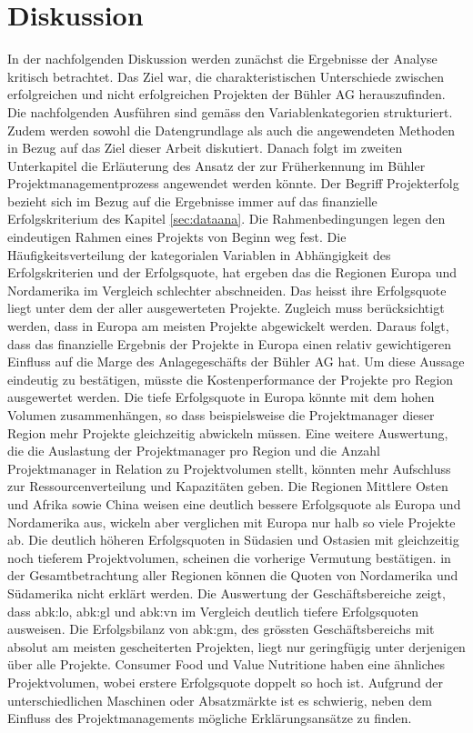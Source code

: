 \chapter{Diskussion}\label{sec:disk}
In der nachfolgenden Diskussion werden zunächst die Ergebnisse der Analyse kritisch betrachtet. Das Ziel war, die charakteristischen Unterschiede zwischen erfolgreichen und nicht erfolgreichen Projekten der Bühler AG herauszufinden. Die nachfolgenden Ausführen sind gemäss den Variablenkategorien strukturiert. Zudem werden sowohl die Datengrundlage als auch die angewendeten Methoden in Bezug auf das Ziel dieser Arbeit diskutiert. Danach folgt im zweiten Unterkapitel die Erläuterung des Ansatz der zur Früherkennung im Bühler Projektmanagementprozess angewendet werden könnte. Der Begriff Projekterfolg bezieht sich im Bezug auf die Ergebnisse immer auf das finanzielle Erfolgskriterium des Kapitel \ref{sec:dataana}.
\newline
Die Rahmenbedingungen legen den eindeutigen Rahmen eines Projekts von Beginn weg fest. Die Häufigkeitsverteilung der kategorialen Variablen in Abhängigkeit des Erfolgskriterien und der Erfolgsquote, hat ergeben das die Regionen Europa und Nordamerika im Vergleich schlechter abschneiden. Das heisst ihre Erfolgsquote liegt unter dem der aller ausgewerteten Projekte. Zugleich muss berücksichtigt werden, dass in Europa am meisten Projekte abgewickelt werden. Daraus folgt, dass das finanzielle Ergebnis der Projekte in Europa einen relativ gewichtigeren Einfluss auf die Marge des Anlagegeschäfts der Bühler AG hat. Um diese Aussage eindeutig zu bestätigen, müsste die Kostenperformance der Projekte pro Region ausgewertet werden. Die tiefe Erfolgsquote in Europa könnte mit dem hohen Volumen zusammenhängen, so dass beispielsweise die Projektmanager dieser Region mehr Projekte gleichzeitig abwickeln müssen. Eine weitere Auswertung, die die Auslastung der Projektmanager pro Region und die Anzahl Projektmanager in Relation zu Projektvolumen stellt, könnten mehr Aufschluss zur Ressourcenverteilung und Kapazitäten geben. Die Regionen Mittlere Osten und Afrika sowie China weisen eine deutlich bessere Erfolgsquote als Europa und Nordamerika aus, wickeln aber verglichen mit Europa nur halb so viele Projekte ab. Die deutlich höheren Erfolgsquoten in Südasien und Ostasien mit gleichzeitig noch tieferem Projektvolumen, scheinen die vorherige Vermutung bestätigen. in der Gesamtbetrachtung aller Regionen können die Quoten von Nordamerika und Südamerika nicht erklärt werden. 
\newline Die Auswertung der Geschäftsbereiche zeigt, dass \gls{abk:lo}, \gls{abk:gl} und \gls{abk:vn} im Vergleich deutlich tiefere Erfolgsquoten ausweisen. Die Erfolgsbilanz von \gls{abk:gm}, des grössten Geschäftsbereichs mit absolut am meisten gescheiterten Projekten, liegt nur geringfügig unter derjenigen über alle Projekte. Consumer Food und Value Nutritione haben eine ähnliches Projektvolumen, wobei erstere Erfolgsquote doppelt so hoch ist. Aufgrund der unterschiedlichen Maschinen oder Absatzmärkte ist es schwierig, neben dem Einfluss des Projektmanagements mögliche Erklärungsansätze zu finden.  %
